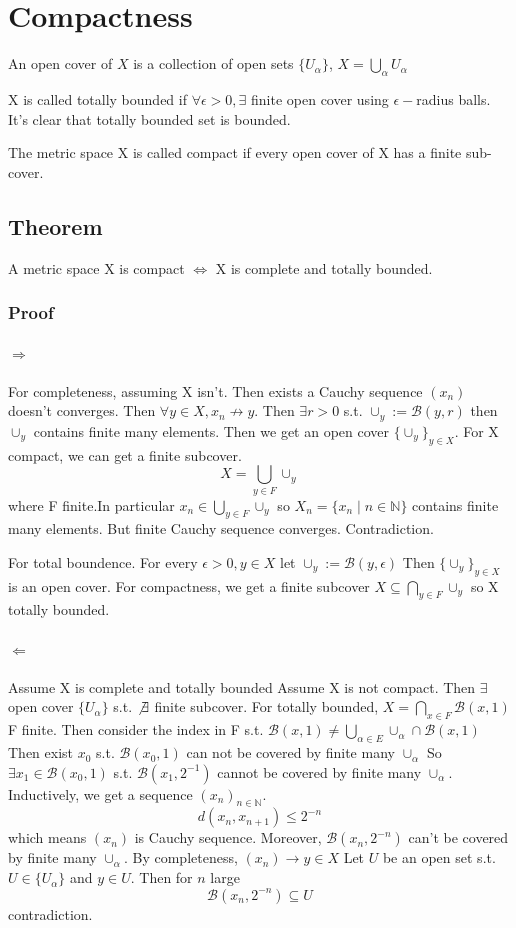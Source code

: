 \documentclass{book}
\begin{document}
\chapter{Compactness}
An open cover of $X$ is a collection of open sets $\{U_\alpha\}$, $X=\bigcup\limits_\alpha U_\alpha$

X is called totally bounded if $\forall \epsilon>0, \exists$ finite open cover using $\epsilon-$radius balls. It's clear that totally bounded set is bounded.

The metric space X is called compact if every open cover of X has a finite sub-cover.
\section{Theorem}
A metric space X is compact $\Leftrightarrow$ X is complete and totally bounded.
\subsection*{Proof}
\subsubsection{$\Rightarrow$}
For completeness, assuming X isn't. Then exists a Cauchy sequence $(x_n)$ doesn't converges. Then $\forall y\in X, x_n\not\rightarrow y$. Then $\exists r>0$ s.t. $\cup_y:=\mathcal{B}(y,r)$ then $\cup_y$ contains finite many elements. Then we get an open cover $\{\cup_y\}_{y\in X}$. For X compact, we can get a finite subcover.$$X=\bigcup\limits_{y\in F}\cup_y$$where F finite.In particular $x_n\in \bigcup\limits_{y\in F}\cup_y$ so $X_n=\{x_n\mid n\in \mathbb N\}$ contains finite many elements. But finite Cauchy sequence converges. Contradiction.

For total boundence. For every $\epsilon>0, y\in X$ let $\cup_y:=\mathcal{B}(y,\epsilon)$ Then $\{\cup_y\}_{y\in X}$ is an open cover. For compactness, we get a finite subcover $X\subseteq\bigcap\limits_{y\in F}\cup_y$ so X totally bounded.
\subsubsection{$\Leftarrow$}Assume X is complete and totally bounded Assume X is not compact. Then $\exists$ open cover $\{U_\alpha\}$ s.t. $
\not\exists$ finite subcover. For totally bounded, $X=\bigcap\limits_{x\in F}\mathcal{B}(x,1)$ F finite. Then consider the index in F s.t. $\mathcal{B}(x,1)\neq\bigcup\limits_{\alpha\in E}\cup_\alpha\cap\mathcal B(x,1)$ Then exist $x_0$ s.t. $\mathcal B(x_0,1)$ can not be covered by finite many $\cup_\alpha$ So $\exists x_1\in \mathcal{B}(x_0,1)$ s.t. $\mathcal B(x_1,2^{-1})$ cannot be covered by finite many $\cup_\alpha$. Inductively, we get a sequence $(x_n)_{n\in \mathbb N}$. $$d(x_n,x_{n+1})\leq 2^{-n}$$ which means $(x_n)$ is Cauchy sequence. Moreover, $\mathcal B(x_n,2^{-n})$ can't be covered by finite many $\cup_\alpha$. By completeness, $(x_n)\rightarrow y\in X$ Let $U$ be an open set s.t. $U\in \{U_\alpha\}$ and $y\in U$. Then for $n$ large$$\mathcal B(x_n,2^{-n})\subseteq U$$contradiction.
\end{document}
